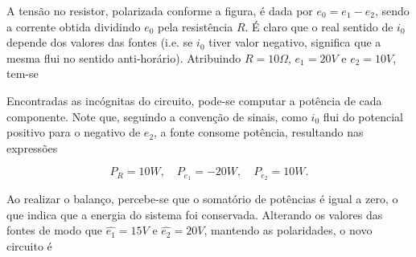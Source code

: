 \documentclass{article}
\numberwithin{equation}{section}
\begin{document}
\begin{center}
\end{center}

\noindent A tensão no resistor, polarizada conforme a figura, é dada por $e_0 = e_1 - e_2$, sendo a corrente obtida dividindo $e_0$ pela resistência $R$. É claro que o real sentido de $i_0$ depende dos valores das fontes (i.e. se $i_0$ tiver valor negativo, significa que a mesma flui no sentido anti-horário). Atribuindo $R=10\Omega$, $e_1 = 20V$ e $e_2=10V$, tem-se

\begin{center}
\end{center}

\noindent Encontradas as incógnitas do circuito, pode-se computar a potência de cada componente. Note que, seguindo a convenção de sinais, como $i_0$ flui do potencial positivo para o negativo de $e_2$, a fonte consome potência, resultando nas expressões

$$ P_R = 10W, \quad P_{e_1} = -20W, \quad P_{e_2} = 10W.$$

\noindent Ao realizar o balanço, percebe-se que o somatório de potências é igual a zero, o que indica que a energia do sistema foi conservada. Alterando os valores das fontes de modo que $\widehat{e_1}=15V$ e $\widehat{e_2}=20V$, mantendo as polaridades, o novo circuito é
\end{document}
